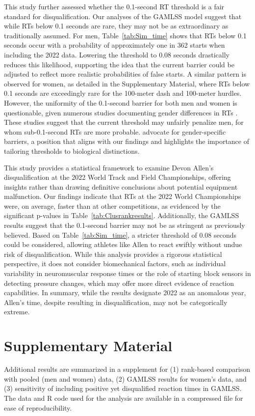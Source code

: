 \documentclass[12pt, letterpaper]{article}
\begin{document}
This study further assessed whether the 0.1-second RT threshold is a
fair standard for disqualification. Our analyses of the GAMLSS model
suggest that while RTs below 0.1 seconds are rare, they may not be
as extraordinary as traditionally assumed. For men,
Table~\ref{tab:Sim_time} shows that RTs below 0.1 seconds
occur with a probability of approximately one in 362 starts when
including the 2022 data. Lowering the threshold to 0.08 seconds
drastically reduces this likelihood, supporting the idea that the
current barrier could be adjusted to reflect more realistic
probabilities of false starts. A similar pattern is observed for
women, as detailed in the Supplementary Material, where RTs
 below 0.1 seconds are exceedingly rare for the 100-meter dash
and 100-meter  hurdles. However, the uniformity of the 0.1-second
barrier for both men and women  is questionable, given numerous
studies documenting gender differences in RTs
\citep[e.g.,][]{lipps2011implications, babicc2009reaction,
  panoutsakopoulos2020gender}. These studies suggest that the current
threshold may  unfairly penalize men, for whom sub-0.1-second RTs are more 
probable. \citet{brosnan2017effects} advocate for
gender-specific barriers, a position that  aligns with our findings
and highlights the importance of tailoring thresholds to biological
distinctions.


This study provides a statistical framework to examine Devon Allen’s
disqualification at the 2022 World Track and Field Championships,
offering insights rather than drawing definitive conclusions about
potential equipment malfunction. Our findings indicate that RTs
 at the 2022 World Championships were, on average, faster than at other
competitions, as evidenced by the significant p-values in
Table~\ref{tab:Clusrankresults}. Additionally, the GAMLSS results
suggest that the 0.1-second barrier may not be as stringent as
previously believed. Based on Table~\ref{tab:Sim_time}, a stricter
threshold of 0.08 seconds could be considered, allowing athletes like
Allen to react swiftly without undue risk of disqualification. While
this analysis provides a rigorous statistical perspective, it does not
consider biomechanical factors, such as individual variability in
neuromuscular response times or the role of starting block sensors in
detecting pressure changes, which may offer more direct evidence of
reaction capabilities. In summary, while the results designate 2022 as
an anomalous year, Allen’s time, despite resulting in
disqualification, may not be categorically extreme.


\section*{Supplementary Material}
Additional results are summarized in a supplement for (1) rank-based
comparison with pooled (men and women) data, (2) GAMLSS results
for women's data, and (3) sensitivity of including positive yet disqualified
reaction times in GAMLSS.
The data and R code used for the analysis are available in a compressed file for
ease of reproducibility.



\end{document}
